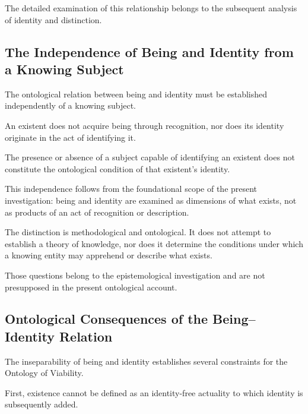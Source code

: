 The detailed examination of this
relationship belongs to the subsequent
analysis of identity and distinction.



\subsection{The Independence of Being and Identity from a Knowing Subject}

The ontological relation between being
and identity must be established
independently of a knowing subject.

An existent does not acquire being
through recognition, nor does its
identity originate in the act of
identifying it.

The presence or absence of a subject
capable of identifying an existent
does not constitute the ontological
condition of that existent's identity.

This independence follows from the
foundational scope of the present
investigation: being and identity
are examined as dimensions of what
exists, not as products of an act
of recognition or description.

The distinction is methodological
and ontological. It does not attempt
to establish a theory of knowledge,
nor does it determine the conditions
under which a knowing entity may
apprehend or describe what exists.

Those questions belong to the
epistemological investigation and
are not presupposed in the present
ontological account.



\subsection{Ontological Consequences of the Being--Identity Relation}

The inseparability of being and identity
establishes several constraints for
the Ontology of Viability.

First, existence cannot be defined
as an identity-free actuality to
which identity is subsequently added.

